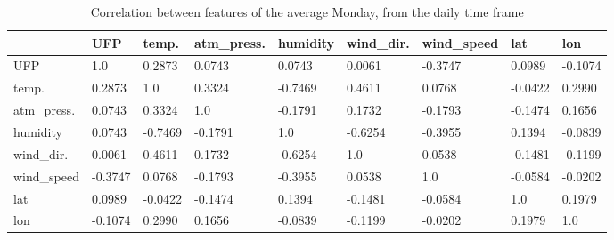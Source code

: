 \documentclass[11pt,a4paper,titlepage]{book}
\begin{document}
\begin{table}[ht]
    \small
    \begin{tabular}{@{}l|llllllll@{}}
    \toprule
                & UFP     & temp.   & atm\_press. & humidity & wind\_dir. & wind\_speed & lat     & lon     \\ \midrule
    UFP         & 1.0     & 0.2873  & 0.0743      & 0.0743   & 0.0061     & -0.3747     & 0.0989  & -0.1074 \\
    temp.       & 0.2873  & 1.0     & 0.3324      & -0.7469  & 0.4611     & 0.0768      & -0.0422 & 0.2990  \\
    atm\_press. & 0.0743  & 0.3324  & 1.0         & -0.1791  & 0.1732     & -0.1793     & -0.1474 & 0.1656  \\
    humidity    & 0.0743  & -0.7469 & -0.1791     & 1.0      & -0.6254    & -0.3955     & 0.1394  & -0.0839 \\
    wind\_dir.  & 0.0061  & 0.4611  & 0.1732      & -0.6254  & 1.0        & 0.0538      & -0.1481 & -0.1199 \\
    wind\_speed & -0.3747 & 0.0768  & -0.1793     & -0.3955  & 0.0538     & 1.0         & -0.0584 & -0.0202 \\
    lat         & 0.0989  & -0.0422 & -0.1474     & 0.1394   & -0.1481    & -0.0584     & 1.0     & 0.1979  \\
    lon         & -0.1074 & 0.2990  & 0.1656      & -0.0839  & -0.1199    & -0.0202     & 0.1979  & 1.0     \\ \bottomrule
    \end{tabular}
    \caption{Correlation between features of the average Monday, from the daily time frame}
    \label{cleanair:correlation-table-monday}
\end{table}
\end{document}
